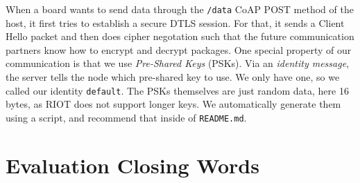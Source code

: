 \documentclass[acmtog, language=english, nonacm]{acmart}
\begin{document}
    When a board wants to send data through the \texttt{/data} CoAP POST method of the host, it first tries to establish a secure DTLS session. For that, it sends a Client Hello packet and then does cipher negotation such that the future communication partners know how to encrypt and decrypt packages. One special property of our communication is that we use \emph{Pre-Shared Keys} (PSKs). Via an \emph{identity message}, the server tells the node which pre-shared key to use. We only have one, so we called our identity \texttt{default}. The PSKs themselves are just random data, here 16 bytes, as RIOT does not support longer keys. We automatically generate them using a script, and recommend that inside of \texttt{README.md}.

    
    \section{Evaluation Closing Words}

    

\end{document}
